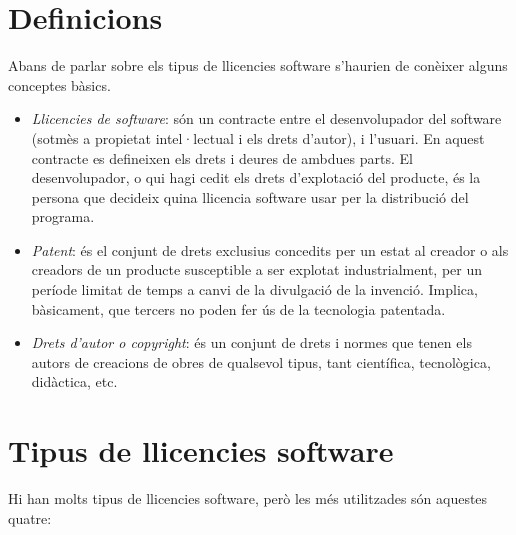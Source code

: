 \section{Definicions}
Abans de parlar sobre els tipus de llicencies software s'haurien 
de conèixer alguns conceptes bàsics.

\begin {itemize}
	\item \emph{Llicencies de software}: són un contracte entre el desenvolupador 
	del software (sotmès a propietat intel·lectual i els drets d'autor), i l'usuari. 
	En aquest contracte es defineixen els drets i deures de ambdues parts. El 
	desenvolupador, o qui hagi cedit els drets d'explotació del producte, és 
	la persona que decideix quina llicencia software usar per la distribució del 
	programa.
	\item \emph{Patent}: és el conjunt de drets exclusius concedits per un estat al 
	creador o als creadors de un producte susceptible a ser explotat industrialment, 
	per un període limitat de temps a canvi de la divulgació de la invenció. Implica,
	bàsicament, que tercers no poden fer ús de la tecnologia patentada. \cite {definicions}
	\item \emph{Drets d'autor o \textit{copyright}}: és un conjunt de drets i normes \cite {copyright}
	que tenen els autors de creacions de obres de qualsevol tipus, tant científica, 
	tecnològica, didàctica, etc.
\end {itemize}

\section{Tipus de llicencies software}
Hi han molts tipus de llicencies software, però les més utilitzades són aquestes quatre:

